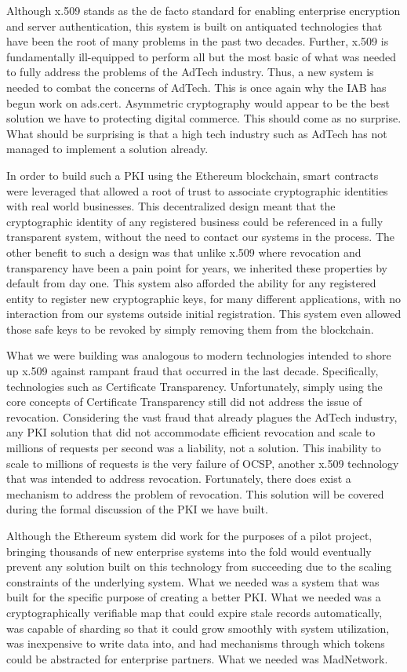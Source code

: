 Although x.509 stands as the de facto standard for enabling enterprise
encryption and server authentication, this system is built on
antiquated technologies that have been the root of many problems in the
past two decades.
Further, x.509 is fundamentally ill-equipped to perform all but the
most basic of what was needed to fully address the problems of the
AdTech industry.
Thus, a new system is needed to combat the concerns of AdTech.
This is once again why the IAB has begun work on ads.cert.
Asymmetric cryptography would appear to be the best solution we have to
protecting digital commerce.
This should come as no surprise.
What should be surprising is that a high tech industry such as AdTech
has not managed to implement a solution already.

In order to build such a PKI using the Ethereum blockchain, smart
contracts were leveraged that allowed a root of trust to associate
cryptographic identities with real world businesses.
This decentralized design meant that the cryptographic identity of any
registered business could be referenced in a fully transparent system,
without the need to contact our systems in the process.
The other benefit to such a design was that unlike x.509 where
revocation and transparency have been a pain point for years, we
inherited these properties by default from day one.
This system also afforded the ability for any registered entity to
register new cryptographic keys, for many different applications, with
no interaction from our systems outside initial registration.
This system even allowed those safe keys to be revoked by simply
removing them from the blockchain.

What we were building was analogous to modern technologies intended to
shore up x.509 against rampant fraud that occurred in the last decade.
Specifically, technologies such as Certificate Transparency.
Unfortunately, simply using the core concepts of Certificate
Transparency still did not address the issue of revocation.
Considering the vast fraud that already plagues the AdTech industry,
any PKI solution that did not accommodate efficient revocation and
scale to millions of requests per second was a liability, not a
solution.
This inability to scale to millions of requests is the very failure of
OCSP, another x.509 technology that was intended to address revocation.
Fortunately, there does exist a mechanism to address the problem of
revocation.
This solution will be covered during the formal discussion of the PKI
we have built.

Although the Ethereum system did work for the purposes of a pilot
project, bringing thousands of new enterprise systems into the fold
would eventually prevent any solution built on this technology from
succeeding due to the scaling constraints of the underlying system.
What we needed was a system that was built for the specific purpose of
creating a better PKI.
What we needed was a cryptographically verifiable map that could expire
stale records automatically, was capable of sharding so that it could
grow smoothly with system utilization, was inexpensive to write data
into, and had mechanisms through which tokens could be abstracted for
enterprise partners.
What we needed was MadNetwork.

